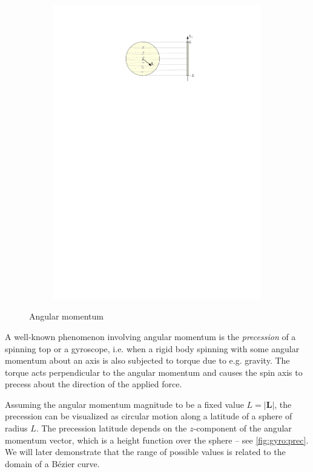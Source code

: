 \documentclass[final,3p,mathptmx]{elsarticle}
\begin{document}
\begin{figure}[h]
\begin{subfigure}{0.32\textwidth}
		\includegraphics[width=\textwidth, keepaspectratio]{figures/momentmap_S2_v3.pdf}
		\label{fig:gyro:prec}
	\end{subfigure}
	\caption{Angular momentum}
	\label{fig:gyro}
\end{figure}

A well-known phenomenon involving angular momentum is the \emph{precession} of a spinning top or a gyroscope, i.e. when a rigid body spinning with some angular momentum about an axis is  also subjected to torque due to e.g. gravity. The torque acts perpendicular to the angular momentum and causes the spin axis to precess about the direction of the applied force.

Assuming the angular momentum magnitude to be a fixed value $L = \left| \mathbf{L} \right| $, the precession can be visualized as circular motion along a latitude of a sphere of radius $L$. The precession latitude depends on the $z$-component of the angular momentum vector, which is a height function over the sphere -- see \autoref{fig:gyro:prec}. We will later demonstrate that the range of possible values is related to the domain of a B\'{e}zier curve.
\end{document}
